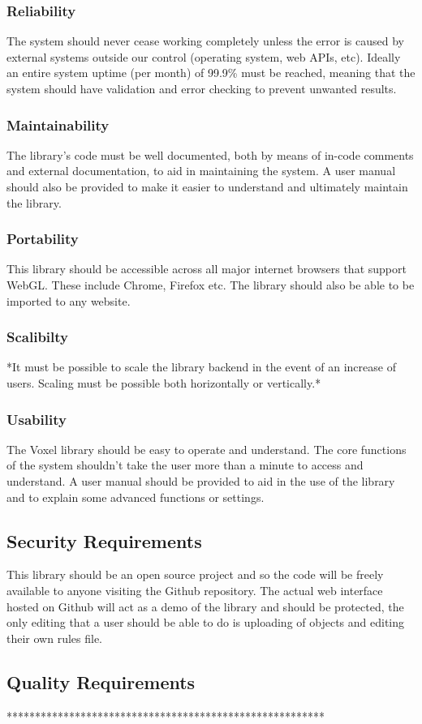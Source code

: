 \documentclass[english]{article}
\begin{document}
		\subsubsection{Reliability}
		The system should never cease working completely unless the error is caused by external systems outside our control (operating system, web APIs, etc). Ideally an entire system uptime (per month) of 99.9\% must be reached, meaning that the system should have validation and error checking to prevent unwanted results.
		
		\subsubsection{Maintainability}
		The library's code must be well documented, both by means of in-code comments and external documentation, to aid in 
		maintaining the system. A user manual should also be provided to make it easier to understand and ultimately maintain the library.
		
		\subsubsection{Portability}
		This library should be accessible across all major internet browsers that support WebGL. These include Chrome, Firefox etc.
		The library should also be able to be imported to any website.
		
		\subsubsection{Scalibilty}
		*It must be possible to scale the library backend in the event of an increase of users. Scaling must be possible both 
		horizontally or vertically.*
		
		\subsubsection{Usability}
		The Voxel library should be easy to operate and understand. The core functions of the system shouldn't take the user more 
		than a minute to access and understand. A user manual should be provided to aid in the use of the library and to explain some advanced functions or settings.
		
		\subsection{Security Requirements}
		This library should be an open source project and so the code will be freely available to anyone visiting the Github repository. The actual web interface hosted on Github will act as a demo of the library and should be protected, the only editing that a user should be able to do is uploading of objects and editing their own rules file.
		
		\subsection{Quality Requirements}
		********************************************************
		
	\pagebreak
	
\end{document}
